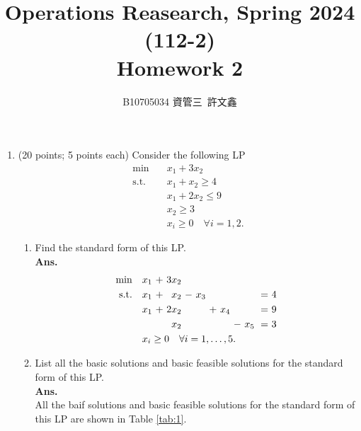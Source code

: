 \documentclass[12pt]{article}
\title{Operations Reasearch, Spring 2024 (112-2)\\ Homework 2}
\author{B10705034 資管三\ 許文鑫}
\begin{document}
\maketitle
\begin{enumerate}
      \item (20 points; 5 points each) Consider the following LP
            \begin{align*}
                  \min \quad        & x_1 + 3x_2                        \\
                  \text{s.t.} \quad & x_1 + x_2 \geq 4                  \\
                                    & x_1 + 2x_2 \leq 9                 \\
                                    & x_2 \geq 3                        \\
                                    & x_i \geq 0 \quad \forall i = 1,2.
            \end{align*}
            \begin{enumerate}
                  \item Find the standard form of this LP.\\
                        \textbf{Ans.}
                        \begin{equation*}
                              \begin{alignedat}{10}
                                    \min \quad       &  & x_1 & \ +\  & 3x_2             \\
                                    \text{s.t.} \quad &  & x_1 & \ +\  & x_2  & \ -\  & x_3 &&&&& \ =\  & 4 \\
                                    && x_1 & \ +\  & 2x_2 & & &\ +\  & x_4 & & & \ =\  & 9\\
                                    && & & x_2 & & & & & \ -\  & x_5 & \ =\  & 3 \\
                                    & \mathrlap{x_i \geq 0\quad \forall i=1,\dots ,5.}
                              \end{alignedat}
                        \end{equation*}
                  \item List all the basic solutions and basic feasible solutions for the standard form of this LP.\\
                        \textbf{Ans.}\\
                        All the baif solutions and basic feasible solutions for the standard form of this LP are shown in Table \ref{tab:1}.

\end{enumerate}
\end{enumerate}
\end{document}
